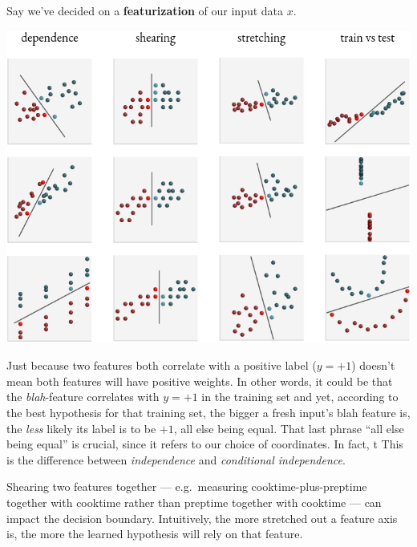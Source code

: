         Say we've decided on a \textbf{featurization} of our input
        data $x$.
        \begin{marginfigure}
          \includegraphics[width=\textwidth]{feature-space-phenomena}
        \end{marginfigure}

        Just because two features both correlate with a positive label ($y=+1$)
        doesn't mean both features will have positive weights.  In other words,
        it could be that the \emph{blah}-feature correlates with $y=+1$ in the
        training set and yet, according to the best hypothesis for that
        training set, the bigger a fresh input's blah feature is, the
        \emph{less} likely its label is to be $+1$, all else being equal.  That
        last phrase ``all else being equal'' is crucial, since it refers to our
        choice of coordinates.
        In fact, t This is the difference between \emph{independence} and
        \emph{conditional independence}.

        Shearing two features together --- e.g.\ measuring
        cooktime-plus-preptime together with cooktime rather than preptime
        together with cooktime --- can impact the decision boundary.
        Intuitively, the more stretched out a feature axis is, the more the
        learned hypothesis will rely on that feature.

